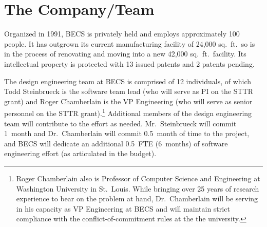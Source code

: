 \section{The Company/Team}
\label{sec:team}

%

Organized in 1991, BECS is privately held and employs approximately 100
people. It has outgrown its current
manufacturing facility of 24,000 sq.~ft.\ so is in the process of
renovating and moving into a new 42,000 sq.~ft.\ facility.
Its intellectual property is protected with 13 issued patents and
2 patents pending.

The design engineering team at BECS is comprised of 12 individuals, of
which Todd Steinbrueck is the software team lead (who will serve as
PI on the STTR grant) and Roger Chamberlain is the VP Engineering (who
will serve as senior personnel on the STTR grant).\footnote{Roger Chamberlain
also is Professor of Computer Science and Engineering at Washington
University in St.~Louis. While bringing over 25 years of research
experience to bear on the problem at hand, Dr.~Chamberlain will be
serving in his capacity as VP Engineering at BECS and will maintain
strict compliance with the conflict-of-commitment rules at the the university.}
Additional members of the design engineering team will contribute to
the effort as needed. Mr.~Steinbrueck will commit 1~month and Dr.~Chamberlain
will commit 0.5~month of time to the project,
and BECS will dedicate an additional
0.5~FTE (6~months) of software engineering effort
(as articulated in the budget).

